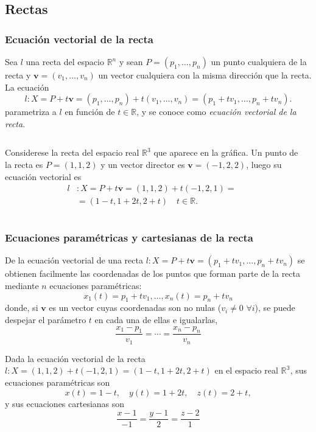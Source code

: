 \subsection{Rectas}
\begin{frame}
	\frametitle{Ecuación vectorial de la recta}
	\begin{definicion}
		Sea $l$ una recta del espacio $\mathbb{R}^n$ y sean $P=(p_1,\ldots,p_n)$ un punto cualquiera de la recta y
		$\mathbf{v}=(v_1,\ldots,v_n)$ un vector cualquiera con la misma dirección que la recta.
		La ecuación
		\[
			l: X= P + t\mathbf{v} = (p_1,\ldots,p_n)+t(v_1,\ldots,v_n) = (p_1+tv_1,\ldots,p_n+tv_n).
		\]
		parametriza a $l$ en función de $t\in \mathbb{R}$, y se conoce como \emph{ecuación vectorial de la recta}.
	\end{definicion}
	\begin{columns}
		\begin{column}{.48\textwidth}
			Considerese la recta del espacio real $\mathbb{R}^3$ que aparece en la gráfica. Un punto de la recta es $P=(1,1,2)$ y un vector director es $\mathbf{v}=(-1,2,2)$, luego su ecuación vectorial es
			\begin{align*}
				l & : X= P + t\mathbf{v} = (1,1,2)+t(-1,2,1) = \\
				  & = (1-t,1+2t,2+t)\quad t\in\mathbb{R}.      
			\end{align*}
		\end{column}
		\begin{column}{.48\textwidth}
			\begin{center}
				\scalebox{0.8}{}
			\end{center}
		\end{column}
	\end{columns}
\end{frame} 


\begin{frame}
	\frametitle{Ecuaciones paramétricas y cartesianas de la recta}
	De la ecuación vectorial de una recta $l: X=P + t\mathbf{v}=(p_1+tv_1,\ldots,p_n+tv_n)$ se obtienen facilmente las coordenadas de los puntos que forman parte de la recta mediante $n$ ecuaciones paramétricas:
	\[
		x_1(t)=p_1+tv_1, \ldots, x_n(t)=p_n+tv_n
	\]
	donde, si $\mathbf{v}$ es un vector cuyas coordenadas son no nulas ($v_i\neq 0$ $\forall i$), se puede despejar el parámetro $t$ en cada una de ellas e igualarlas,
	\[
		\frac{x_1-p_1}{v_1}=\cdots = \frac{x_n-p_n}{v_n}
	\] 
	
	Dada la ecuación vectorial de la recta $l: X=(1,1,2)+t(-1,2,1) =(1-t,1+2t,2+t)$ en el espacio real $\mathbb{R^3}$, sus
	ecuaciones paramétricas son
	\[
		x(t) = 1-t, \quad y(t)=1+2t, \quad z(t)=2+t,
	\]
	y sus ecuaciones cartesianas son
	\[
		\frac{x-1}{-1}=\frac{y-1}{2}=\frac{z-2}{1}
	\]
\end{frame} 


